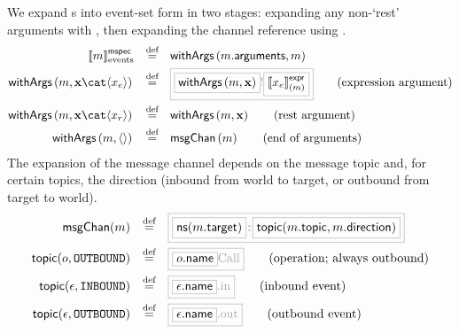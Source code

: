 \begin{definition}

We expand \mmessagespec s into event-set form in two stages: expanding
any non-`rest' arguments with , then expanding the channel
reference using .
%
\begin{align*}
	\emspecsema{\amspec}
\quad\defeq\quad&
\funcname{withArgs}\left(\field{\amspec}{arguments}, \amspec\right)
\\
	\funcname{withArgs}\left(\amspec, \anarglist\cat\langle\anexprarg\rangle\right)
\quad\defeq\quad&
\tlang{
	\olang{\funcname{withArgs}\left(\amspec, \anarglist\right)}
	!\olang{\exprsema{\anexprarg}{\amspec}}
}
\tag{expression argument}
\\
	\funcname{withArgs}\left(\amspec, \anarglist\cat\langle\arestarg\rangle\right)
\quad\defeq\quad&
	\funcname{withArgs}\left(\amspec, \anarglist\right)
\tag{rest argument}
\\
	\funcname{withArgs}\left(\amspec, \langle\rangle\right)
\quad\defeq\quad&
	\funcname{msgChan}\left(\amspec\right)
\tag{end of arguments}
\end{align*}
The expansion of the message channel
depends on the message topic
and, for certain topics, the direction (inbound from world to target, or
outbound from target to world).
\newcommand{\nsOf}[1]{\mathsf{ns}(#1)}
\newcommand{\topicOf}[2]{\mathsf{topic}(#1,#2)}
%
\begin{align*}
	\funcname{msgChan}(\amspec)
\quad\defeq\quad&
\tlang{
	\olang{\nsOf{\field{\amspec}{target}}}
	{}\cspnsop{}
	\olang{\topicOf{\field{\amspec}{topic}}{\field{\amspec}{direction}}}
}
\\
	\topicOf{\anop}{\texttt{OUTBOUND}}
\quad\defeq\quad&
\tlang{
	\olang{\field{\anop}{name}}\text{Call}
}
\tag{operation; always outbound}
\\
	\topicOf{\anevent}{\texttt{INBOUND}}
\quad\defeq\quad&
	\tlang{\olang{\field{\anevent}{name}}\text{.in}}
\tag{inbound event}
\\
	\topicOf{\anevent}{\texttt{OUTBOUND}}
\quad\defeq\quad&
	\tlang{\olang{\field{\anevent}{name}}\text{.out}}
\tag{outbound event}
\end{align*}
\end{definition}

\newcommand{\paramsOf}[1]{\funcname{params}(#1)}
\newcommand{\beforeRest}[1]{\funcname{beforeRest}(#1)}

